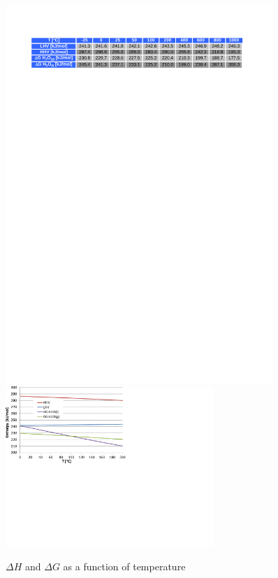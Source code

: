 \documentclass[11pt,a4paper,english,twoside]{scrreprt}
\begin{document}
\begin{figure}
  \centering
  \includegraphics*[width=0.9\textwidth,angle=0]{FCF_Table_LHV_HHV.pdf}  
  \includegraphics*[width=0.7\textwidth,angle=0]{FCF_Chart_LHV_HHV.pdf}  
  \caption[$\Delta H$ and $\Delta G$ as a function of temperature]{$\Delta H$ and $\Delta G$ as a function of temperature}
  \label{fig:DG_DH}
\end{figure}
\end{document}
